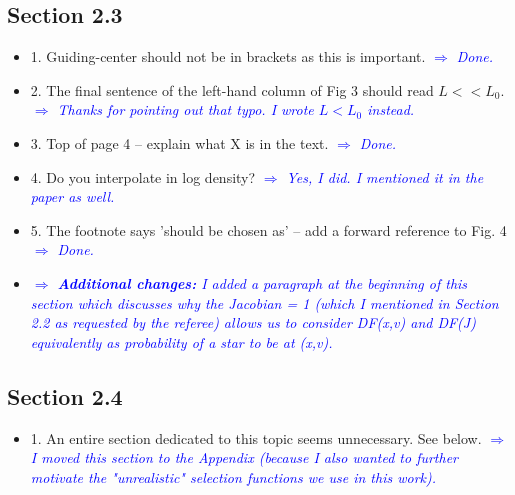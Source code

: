 \documentclass[10pt,a4paper]{article}
\newcommand{\Comment}[1]{\textsl{\textcolor{Blue}{$\Longrightarrow$ {#1}}}}
\begin{document}
\subsection{Section 2.3}
\begin{itemize}
\item 1. Guiding-center should not be in brackets as this is important. \Comment{Done.}
\item 2. The final sentence of the left-hand column of Fig 3 should read $L<<L_0$. \Comment{Thanks for pointing out that typo. I wrote $L < L_0$ instead.}
\item 3. Top of page 4 -- explain what X is in the text. \Comment{Done.}
\item 4. Do you interpolate in log density? \Comment{Yes, I did. I mentioned it in the paper as well.}
\item 5. The footnote says 'should be chosen as' -- add a forward reference to Fig. 4 \Comment{Done.}
\item \Comment{\textbf{Additional changes:} I added a paragraph at the beginning of this section which discusses why the Jacobian = 1 (which I mentioned in Section 2.2 as requested by the referee) allows us to consider DF(x,v) and DF(J) equivalently as probability of a star to be at (x,v).}
\end{itemize}

\subsection{Section 2.4}
\begin{itemize}
\item 1. An entire section dedicated to this topic seems unnecessary. See below. \Comment{I moved this section to the Appendix (because I also wanted to further motivate the "unrealistic" selection functions we use in this work).}
\end{itemize}
\end{document}
